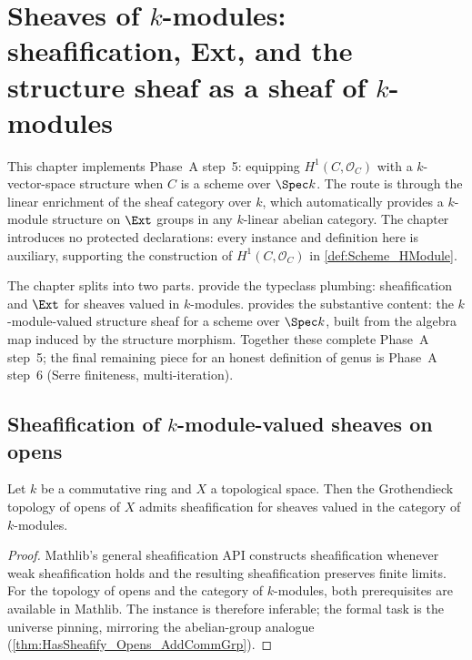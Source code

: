 \chapter{Sheaves of \(k\)-modules: sheafification, Ext, and the structure sheaf as a sheaf of \(k\)-modules}
\label{chap:Cohomology_StructureSheafModuleK}

This chapter implements Phase~A step~5: equipping \(H^1(C, \mathcal O_C)\) with a \(k\)-vector-space structure when \(C\) is a scheme over \(\Spec k\). The route is through the linear enrichment of the sheaf category over \(k\), which automatically provides a \(k\)-module structure on \(\Ext\) groups in any \(k\)-linear abelian category. The chapter introduces no protected declarations: every instance and definition here is auxiliary, supporting the construction of \(H^1(C, \mathcal O_C)\) in \cref{def:Scheme_HModule}.

The chapter splits into two parts.  provide the typeclass plumbing: sheafification and \(\Ext\) for sheaves valued in \(k\)-modules.  provides the substantive content: the \(k\)-module-valued structure sheaf for a scheme over \(\Spec k\), built from the algebra map induced by the structure morphism. Together these complete Phase~A step~5; the final remaining piece for an honest definition of genus is Phase~A step~6 (Serre finiteness, multi-iteration).

\section{Sheafification of \(k\)-module-valued sheaves on opens}
\label{sec:moduleK_prereqs}

\begin{theorem}
  \label{thm:HasSheafify_Opens_ModuleCatK}
  Let \(k\) be a commutative ring and \(X\) a topological space. Then the Grothendieck topology of opens of \(X\) admits sheafification for sheaves valued in the category of \(k\)-modules.
\end{theorem}

\begin{proof}


\leanok
  Mathlib's general sheafification API constructs sheafification whenever weak sheafification holds and the resulting sheafification preserves finite limits. For the topology of opens and the category of \(k\)-modules, both prerequisites are available in Mathlib. The instance is therefore inferable; the formal task is the universe pinning, mirroring the abelian-group analogue (\cref{thm:HasSheafify_Opens_AddCommGrp}).
\end{proof}

